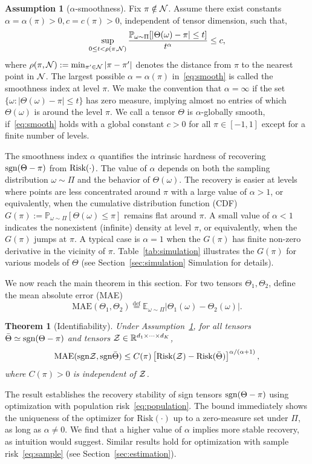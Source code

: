 \documentclass[11pt]{article}
\theoremstyle{plain}
\newtheorem{thm}{Theorem}
\theoremstyle{definition}
\newtheorem{assumption}{Assumption}
\def\sign{\textup{sgn}}
\def\risk{\textup{Risk}}
\begin{document}
\begin{assumption}[$\alpha$-smoothness]\label{ass:margin} 
Fix $\pi\notin \mathcal{N}$. Assume there exist constants $\alpha=\alpha(\pi)> 0, c=c(\pi) >0$, independent of tensor dimension, such that, 
\begin{equation}\label{eq:smooth}
\sup_{0\leq t<\rho(\pi, \mathcal{N})}{\mathbb{P}_{\omega \sim \Pi}[|\Theta (\omega)-\pi|\leq t ]\over t^\alpha} \leq c,
\end{equation}
where $\rho(\pi,\mathcal{N}):=\min_{\pi'\in \mathcal{N}}|\pi-\pi'|$ denotes the distance from $\pi$ to the nearest point in $\mathcal{N}$. The largest possible $\alpha=\alpha(\pi)$ in~\eqref{eq:smooth} is called the smoothness index at level $\pi$. We make the convention that $\alpha= \infty$ if the set $\{\omega\colon |\Theta(\omega)-\pi|\leq t\}$ has zero measure, implying almost no entries of which $\Theta(\omega)$ is around the level $\pi$. We call a tensor $\Theta$ is $\alpha$-globally smooth, if~\eqref{eq:smooth} holds with a global constant $c>0$ for all $\pi\in[-1,1]$ except for a finite number of levels. 
\end{assumption}

The smoothness index $\alpha$ quantifies the intrinsic hardness of recovering $\sign(\Theta-\pi)$ from $\risk(\cdot)$. 
The value of $\alpha$ depends on both the sampling distribution $\omega\sim \Pi$ and the behavior of $\Theta(\omega)$. 
The recovery is easier at levels where points are less concentrated around $\pi$ with a large value of $\alpha>1$, or equivalently, when the cumulative distribution function (CDF) $G(\pi):=\mathbb{P}_{\omega\sim \Pi}[\Theta(\omega)\leq \pi]$ remains flat around $\pi$. A small value of $\alpha<1$ indicates the nonexistent (infinite) density at level $\pi$, or equivalently, when the $G(\pi)$ jumps at $\pi$.  A typical case is $\alpha=1$ when the $G(\pi)$ has finite non-zero derivative in the vicinity of $\pi$. Table~\ref{tab:simulation} illustrates the $G(\pi)$ for various models of $\Theta$ (see Section~\ref{sec:simulation} Simulation for details). 

We now reach the main theorem in this section. For two tensors $\Theta_1,\Theta_2$, define the mean absolute error (MAE)
\[
\text{MAE}(\Theta_1, \Theta_2)\stackrel{\text{def}}{=}\mathbb{E}_{\omega\sim \Pi}|\Theta_1(\omega)-\Theta_2(\omega)|.
\]
\begin{thm}[Identifiability]\label{thm:population}Under Assumption~\ref{ass:margin}, for all tensors $\bar \Theta \simeq \sign(\Theta-\pi)$ and tensors $\mathcal{Z}\in\mathbb{R}^{d_1\times \cdots \times d_K}$,
\[
\textup{MAE}(\sign \tZ, \sign \bar \Theta) \leq C(\pi)\left[\textup{Risk}(\tZ)-\textup{Risk}( \bar \Theta)\right]^{\alpha/(\alpha+1)},
\]
where $C(\pi)>0$ is independent of $\mathcal{Z}$. 
\end{thm}
The result establishes the recovery stability of sign tensors $\sign (\Theta-\pi)$ using optimization with population risk~\eqref{eq:population}. The bound immediately shows the uniqueness of the optimizer  for $\text{Risk}(\cdot)$ up to a zero-measure set under $\Pi$, as long as $\alpha\neq 0$. We find that a higher value of $\alpha$ implies more stable recovery, as intuition would suggest. Similar results hold for optimization with sample risk~\eqref{eq:sample} (see Section~\ref{sec:estimation}). 
\end{document}
